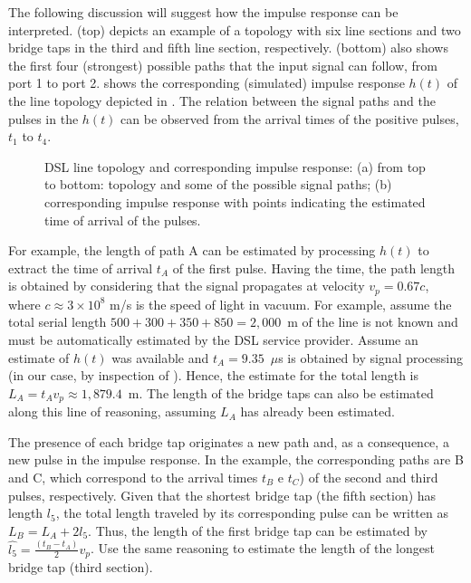 The following discussion will suggest how the impulse response can be interpreted.
 (top) depicts an example of a topology with six line sections and two bridge taps in the third and fifth line section, respectively.  (bottom) also shows the first four (strongest) possible paths that the input signal can follow, from port 1 to port 2.  shows the corresponding (simulated) impulse response $h(t)$ of the line topology depicted in . The relation between the signal paths and the pulses in the $h(t)$ can be observed from the arrival times of the positive pulses, $t_1$ to $t_4$.

\begin{figure}[!htbp]
	\center
	\caption[DSL line topology and corresponding impulse response]{DSL line topology and corresponding impulse response: (a) from top to bottom: topology and some of the possible signal paths; (b) corresponding impulse response with points indicating the estimated time of arrival of the pulses.}
	\label{fig:DELTexample}
\end{figure}

For example, the length of path A can be estimated by processing $h(t)$ to extract the time of arrival $t_A$ of the first pulse. Having the time, the path length is obtained by considering that the signal propagates at velocity $v_p = 0.67 c$, where $c \approx 3 \times 10^8$ m/s is the speed of light in vacuum. For example, assume the total serial length $500+300+350+850=2,000$~m of the line is not known and must be automatically estimated by the DSL service provider.
Assume an estimate of $h(t)$ was available and $t_A=9.35$~$\mu$s is obtained by signal processing (in our case, by inspection of ). Hence, the estimate for the total length is $L_A = t_{A} v_p \approx 1,879.4$~m.
The length of the bridge taps can also be estimated along this line of reasoning, assuming $L_A$ has already been estimated.

The presence of each bridge tap originates a new path and, as a consequence, a new pulse in the impulse response. In the example, the corresponding paths are B and C, which correspond to the arrival times $t_{B}$ e $t_{C}$) of the second and third pulses, respectively. Given that the shortest bridge tap (the fifth section) has length $l_5$, the total length traveled by its corresponding pulse can be written as
${L_B} = {L_A} + 2{l_5}$.
Thus, the length of the first bridge tap can be estimated by
$\hat {l_5} = \frac{{\left( {{t_B} - {t_A}} \right)}}{2}{v_p}$.
Use the same reasoning to estimate the length of the longest bridge tap (third section). 

